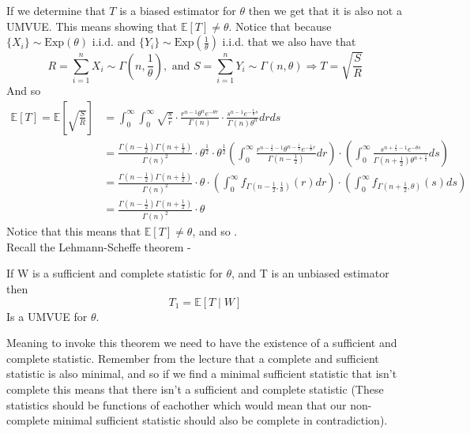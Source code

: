 \documentclass[../main.tex]{subfiles}
\begin{document}
\begin{enumerate}
    If we determine that $T$ is a biased estimator for $\theta$ then we get that it is also not a UMVUE. This means showing that $\mathbb{E}[T]\neq \theta$. Notice that because $\{X_i\}\sim \text{Exp}(\theta)$ i.i.d. and $\{Y_i\}\sim \text{Exp}(\frac{1}{\theta})$ i.i.d. that we also have that
    \[R=\sum_{i=1}^n X_i\sim\Gamma \left(n, \frac{1}{\theta}\right), \text{ and }S=\sum_{i=1}^n Y_i \sim \Gamma\left(n, \theta\right)\Longrightarrow T=\sqrt{\frac{S}{R}}\]
    And so 
    \begin{align*}
        \mathbb{E}[T] = \mathbb{E}\left[\sqrt{\frac{S}{R}}\right] &= \int_0^\infty\int_0^\infty \sqrt{\frac{s}{r}} \cdot \frac{r^{n-1}\theta^n e^{-\theta r}}{\Gamma(n)}\cdot \frac{s^{n-1}e^{-\frac{1}{\theta} s}}{\Gamma(n)\theta^n}drds \\
        &=\frac{\Gamma(n-\frac{1}{2})\Gamma(n+\frac{1}{2})}{\Gamma(n)^2}\cdot \theta^{\frac{1}{2}}\cdot \theta^{\frac{1}{2}}\left(\int_0^\infty \frac{r^{n-\frac{1}{2}-1}\theta^{n-\frac{1}{2}}e^{-\frac{1}{\theta}r}}{\Gamma(n-\frac{1}{2})}dr\right)\cdot \left(\int_0^\infty \frac{s^{n+\frac{1}{2}-1} e^{-\theta s}}{\Gamma(n+\frac{1}{2})\theta^{n+\frac{1}{2}}}ds\right) \\
        &= \frac{\Gamma(n-\frac{1}{2})\Gamma(n+\frac{1}{2})}{\Gamma(n)^2}\cdot \theta \cdot \left(\int_0^\infty f_{\Gamma(n-\frac{1}{2}, \frac{1}{\theta})}(r)dr \right) \cdot \left(\int_0^\infty f_{\Gamma(n+\frac{1}{2}, \theta)}(s)ds \right)\\ &= \frac{\Gamma(n-\frac{1}{2})\Gamma(n+\frac{1}{2})}{\Gamma(n)^2}\cdot \theta
    \end{align*}
    Notice that this means that $\mathbb{E}[T]\neq \theta$, and so . \qedsymbol\\
    
    Recall the Lehmann-Scheffe theorem - 
    
    \begin{mdframed}[backgroundcolor=blue!20] 
        \begin{theorem}
            If W is a sufficient and complete statistic for $\theta$, and T is an unbiased estimator then 
            \[T_1 = \mathbb{E}[T\mid W]\]
            Is a UMVUE for $\theta$. 
        \end{theorem}
    \end{mdframed}
    
    Meaning to invoke this theorem we need to have the existence of a sufficient and complete statistic. Remember from the lecture that a complete and sufficient statistic is also minimal, and so if we find a minimal sufficient statistic that isn't complete this means that there isn't a sufficient and complete statistic (These statistics should be functions of eachother which would mean that our non-complete minimal sufficient statistic should also be complete in contradiction). \\
    

\end{enumerate}
\end{document}
